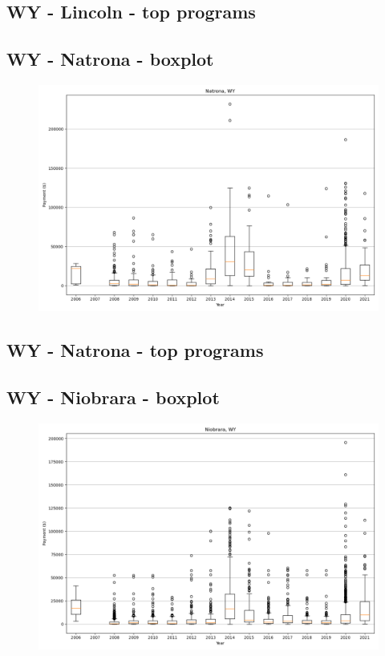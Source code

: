\subsection*{WY - Lincoln - top programs}

\newpage
\subsection*{WY - Natrona - boxplot}
\begin{figure}[h]
\centering
\includegraphics[width=7in]{../output/boxplots/counties/Natrona-WY_boxplot.png}
\end{figure}


\subsection*{WY - Natrona - top programs}

\newpage
\subsection*{WY - Niobrara - boxplot}
\begin{figure}[h]
\centering
\includegraphics[width=7in]{../output/boxplots/counties/Niobrara-WY_boxplot.png}
\end{figure}


